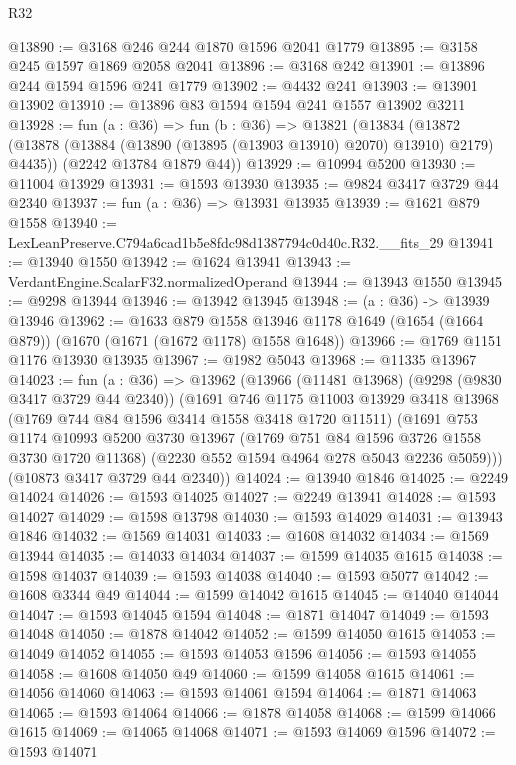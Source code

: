 \begin{lexlean}{R32}
\begin{coremodule}
@13890 := @3168 @246 @244 @1870 @1596 @2041 @1779
@13895 := @3158 @245 @1597 @1869 @2058 @2041
@13896 := @3168 @242
@13901 := @13896 @244 @1594 @1596 @241 @1779
@13902 := @4432 @241
@13903 := @13901 @13902
@13910 := @13896 @83 @1594 @1594 @241 @1557 @13902 @3211
@13928 := fun (a : @36) =>
  fun (b : @36) =>
  @13821
    (@13834
      (@13872 (@13878 (@13884 (@13890 (@13895 (@13903 @13910) @2070) @13910) @2179) @4435))
      (@2242 @13784 @1879 @44))
@13929 := @10994 @5200
@13930 := @11004 @13929
@13931 := @1593 @13930
@13935 := @9824 @3417 @3729 @44 @2340
@13937 := fun (a : @36) => @13931 @13935
@13939 := @1621 @879 @1558
@13940 := LexLeanPreserve.C794a6cad1b5e8fdc98d1387794c0d40c.R32.__fits_29
@13941 := @13940 @1550
@13942 := @1624 @13941
@13943 := VerdantEngine.ScalarF32.normalizedOperand
@13944 := @13943 @1550
@13945 := @9298 @13944
@13946 := @13942 @13945
@13948 := (a : @36) -> @13939 @13946
@13962 := @1633
    @879
    @1558
    @13946
    @1178
    @1649
    (@1654 (@1664 @879))
    (@1670 (@1671 (@1672 @1178) @1558 @1648))
@13966 := @1769 @1151 @1176 @13930 @13935
@13967 := @1982 @5043
@13968 := @11335 @13967
@14023 := fun (a : @36) =>
  @13962
    (@13966
      (@11481 @13968)
      (@9298 (@9830 @3417 @3729 @44 @2340))
      (@1691
        @746
        @1175
        @11003
        @13929
        @3418
        @13968
        (@1769 @744 @84 @1596 @3414 @1558 @3418 @1720 @11511)
        (@1691
          @753
          @1174
          @10993
          @5200
          @3730
          @13967
          (@1769 @751 @84 @1596 @3726 @1558 @3730 @1720 @11368)
          (@2230 @552 @1594 @4964 @278 @5043 @2236 @5059)))
      (@10873 @3417 @3729 @44 @2340))
@14024 := @13940 @1846
@14025 := @2249 @14024
@14026 := @1593 @14025
@14027 := @2249 @13941
@14028 := @1593 @14027
@14029 := @1598 @13798
@14030 := @1593 @14029
@14031 := @13943 @1846
@14032 := @1569 @14031
@14033 := @1608 @14032
@14034 := @1569 @13944
@14035 := @14033 @14034
@14037 := @1599 @14035 @1615
@14038 := @1598 @14037
@14039 := @1593 @14038
@14040 := @1593 @5077
@14042 := @1608 @3344 @49
@14044 := @1599 @14042 @1615
@14045 := @14040 @14044
@14047 := @1593 @14045 @1594
@14048 := @1871 @14047
@14049 := @1593 @14048
@14050 := @1878 @14042
@14052 := @1599 @14050 @1615
@14053 := @14049 @14052
@14055 := @1593 @14053 @1596
@14056 := @1593 @14055
@14058 := @1608 @14050 @49
@14060 := @1599 @14058 @1615
@14061 := @14056 @14060
@14063 := @1593 @14061 @1594
@14064 := @1871 @14063
@14065 := @1593 @14064
@14066 := @1878 @14058
@14068 := @1599 @14066 @1615
@14069 := @14065 @14068
@14071 := @1593 @14069 @1596
@14072 := @1593 @14071

\end{coremodule}
\end{lexlean}
